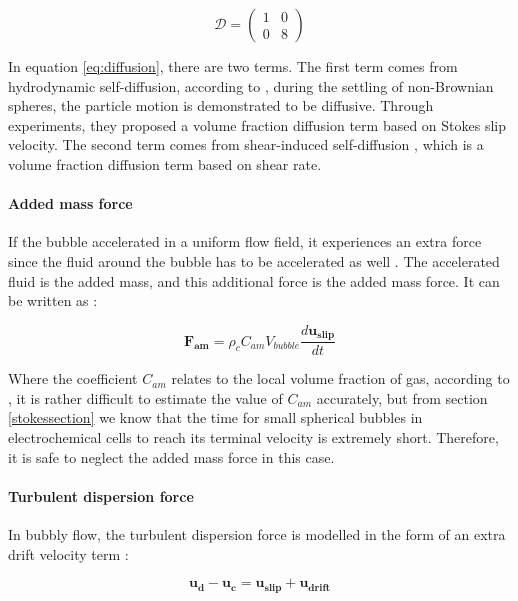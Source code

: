 \begin{equation} 
\mathcal{D} = \begin{pmatrix}1 & 0\\ 0 & 8\end{pmatrix}
\end{equation}


In equation \ref{eq:diffusion}, there are two terms. The first term comes from hydrodynamic self-diffusion, according to \cite{nicolai1995particle}, during the settling of non-Brownian spheres, the particle motion is demonstrated to be diffusive. Through experiments, they proposed a volume fraction diffusion term based on Stokes slip velocity. The second term comes from shear-induced self-diffusion \cite{schaflinger1990centrifugal}, which is a volume fraction diffusion term based on shear rate.

\paragraph{Added mass force}
\*

If the bubble accelerated in a uniform flow field, it experiences an extra force since the fluid around the bubble has to be accelerated as well \cite{kundu2015fluid}. The accelerated fluid is the added mass, and this additional force is the added mass force. It can be written as \cite{Darmana2005}:

\begin{equation}
    \mathbf{ F_{am} } = \rho_c C_{am} V_{bubble} \frac{d\mathbf{u_{slip}}}{dt}
\end{equation}

Where the coefficient $C_{am}$ relates to the local volume fraction of gas, according to \cite{Sokolichin2004}, it is rather difficult to estimate the value of $C_{am}$ accurately, but from section \ref{stokessection} we know that the time for small spherical bubbles in electrochemical cells to reach its terminal velocity is extremely short. Therefore, it is safe to neglect the added mass force in this case.

\paragraph{Turbulent dispersion force}
\*

In bubbly flow, the turbulent dispersion force is modelled in the form of an extra drift velocity term \cite{Sokolichin2004}:

\begin{equation}
    \mathbf{u_d} - \mathbf{u_c} = \mathbf{u_{slip}} + \mathbf{u_{drift}}
\end{equation}

